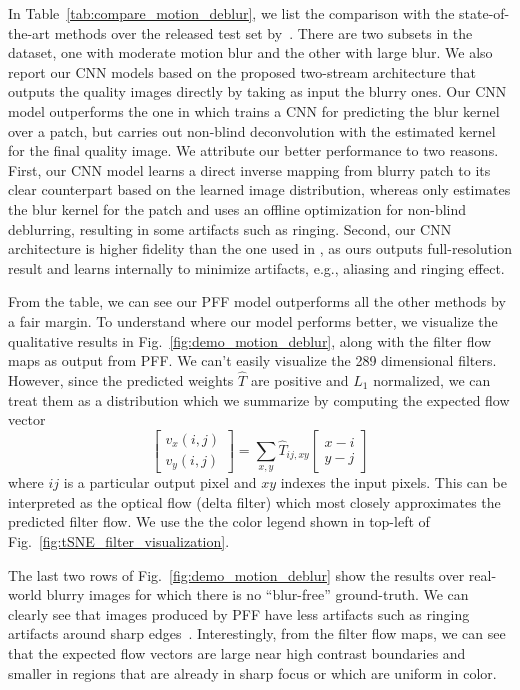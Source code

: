 \documentclass[10pt,twocolumn,letterpaper]{article}
\begin{document}
In Table~\ref{tab:compare_motion_deblur}, we list the comparison with the
state-of-the-art methods over the released test set by~\cite{bahat2017non}.
There are two subsets in the dataset, one with moderate motion blur and the
other with large blur.  We also report our CNN models based on the proposed
two-stream architecture that outputs the quality images directly by taking as
input the blurry ones.  Our CNN model outperforms the one in
\cite{sun2015learning} which trains a CNN for predicting the blur kernel over a
patch, but carries out non-blind deconvolution with the estimated kernel for
the final quality image.  We attribute our better performance to two reasons.
First, our CNN model learns a direct inverse mapping from blurry patch to its
clear counterpart based on the learned image distribution,
whereas \cite{sun2015learning} only estimates the blur kernel for the patch and uses
an offline optimization for non-blind deblurring, resulting in some artifacts
such as ringing.  Second, our CNN architecture is higher fidelity than the one
used in \cite{sun2015learning}, as ours outputs full-resolution result and
learns internally to minimize artifacts, e.g., aliasing and ringing effect.

From the table, we can see our PFF model outperforms all the other methods by
a fair margin.  To understand where our model performs better,
we visualize the qualitative results in Fig.~\ref{fig:demo_motion_deblur},
along with the filter flow maps as output from PFF. We can't easily visualize
the 289 dimensional filters.  However, since the predicted weights $\hat T$ are
positive and $L_1$ normalized, we can treat them as a distribution which we
summarize by computing the expected flow vector
\[
\begin{bmatrix}
v_x(i,j)\\ v_y(i,j)
\end{bmatrix}
= \sum_{x,y} {\hat T}_{ij,xy}
\begin{bmatrix}
x - i\\ y - j
\end{bmatrix}
\]
where $ij$ is a particular output pixel and $xy$ indexes the input pixels.
This can be interpreted as the optical flow (delta filter) which most closely
approximates the predicted filter flow.  We use the the color legend shown in
top-left of Fig.~\ref{fig:tSNE_filter_visualization}.

The last two rows of Fig.~\ref{fig:demo_motion_deblur} show the results over
real-world blurry images for which there is no ``blur-free'' ground-truth.  We
can clearly see that images produced by PFF have less artifacts such as ringing
artifacts around sharp edges~\cite{sun2015learning,bahat2017non}.
Interestingly, from the filter flow maps, we can see that the expected flow
vectors are large near high contrast boundaries and smaller in regions that are
already in sharp focus or which are uniform in color.
\end{document}
